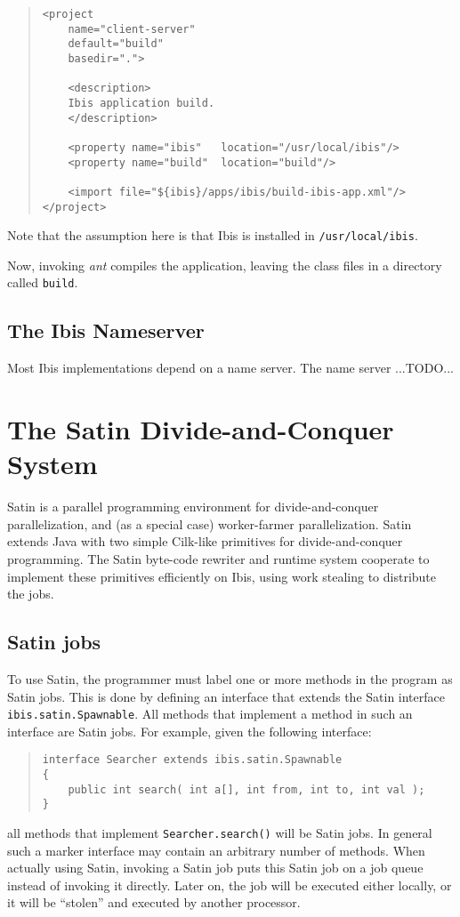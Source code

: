 \documentclass[10pt]{article}
\newcommand{\mysection}[1]{\section{#1}\label{#1}}
\newcommand{\mysubsection}[1]{\subsection{#1}\label{#1}}
\begin{document}
\begin{quote}
\begin{verbatim}
<project
    name="client-server"
    default="build"
    basedir=".">

    <description>
    Ibis application build.
    </description>

    <property name="ibis"   location="/usr/local/ibis"/>
    <property name="build"  location="build"/>

    <import file="${ibis}/apps/ibis/build-ibis-app.xml"/>
</project>
\end{verbatim}
\end{quote}
Note that the assumption here is that Ibis is installed in
\verb+/usr/local/ibis+.

Now, invoking \emph{ant} compiles the application, leaving the class files
in a directory called \verb+build+.

\mysubsection{The Ibis Nameserver}

Most Ibis implementations depend on a name server.
The name server ...TODO...

\mysection{The Satin Divide-and-Conquer System}

Satin is a parallel programming environment for divide-and-conquer
parallelization, and (as a special case) worker-farmer parallelization.
Satin extends Java with two simple Cilk-like primitives for
divide-and-conquer programming.  The Satin byte-code rewriter and
runtime system cooperate to implement these primitives efficiently on
Ibis, using work stealing to distribute the jobs.

\mysubsection{Satin jobs}

To use Satin, the programmer must label one or more methods in the program
as Satin jobs. This is done by defining an interface that extends
the Satin interface \verb+ibis.satin.Spawnable+.
All methods that implement a method in such an
interface are Satin jobs. For example, given the following interface:

\begin{quote}
\begin{verbatim}
interface Searcher extends ibis.satin.Spawnable
{
    public int search( int a[], int from, int to, int val );
}
\end{verbatim}
\end{quote}

all methods that implement \verb+Searcher.search()+ will be Satin jobs.
In general such a marker interface may contain an arbitrary number
of methods.
When actually using Satin, invoking a Satin job puts this Satin job
on a job queue instead of invoking it directly.
Later on, the job will be executed either locally, or it will be
``stolen'' and executed by another processor.
\end{document}
